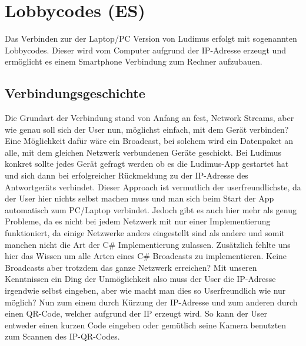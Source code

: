 \section{Lobbycodes (ES)} 
Das Verbinden zur der Laptop/PC Version von Ludimus erfolgt mit sogenannten Lobbycodes. Dieser wird vom Computer aufgrund der IP-Adresse erzeugt und ermöglicht es einem Smartphone Verbindung zum Rechner aufzubauen.
\subsection{Verbindungsgeschichte}
Die Grundart der Verbindung stand von Anfang an fest, Network Streams, aber wie genau soll sich der User nun, möglichst einfach, mit dem Gerät verbinden? Eine Möglichkeit dafür wäre ein Broadcast, bei solchem wird ein Datenpaket an alle, mit dem gleichen Netzwerk verbundenen Geräte geschickt. Bei Ludimus konkret sollte jedes Gerät gefragt werden ob es die Ludimus-App gestartet hat und sich dann bei erfolgreicher Rückmeldung zu der IP-Adresse des Antwortgeräts verbindet. Dieser Approach ist vermutlich der userfreundlichste, da der User hier nichts selbst machen muss und man sich beim Start der App automatisch zum PC/Laptop verbindet. Jedoch gibt es auch hier mehr als genug Probleme, da es nicht bei jedem Netzwerk mit nur einer Implementierung funktioniert, da einige Netzwerke anders eingestellt sind als andere und somit manchen nicht die Art der C\# Implementierung zulassen. Zusätzlich fehlte uns hier das Wissen um alle Arten eines C\# Broadcasts zu implementieren. Keine Broadcasts aber trotzdem das ganze Netzwerk erreichen? Mit unseren Kenntnissen ein Ding der Unmöglichkeit also muss der User die IP-Adresse irgendwie selbst eingeben, aber wie macht man dies so Userfreundlich wie nur möglich? Nun zum einem durch Kürzung der IP-Adresse und zum anderen durch einen QR-Code, welcher aufgrund der IP erzeugt wird. So kann der User entweder einen kurzen Code eingeben oder gemütlich seine Kamera benutzten zum Scannen des IP-QR-Codes.
